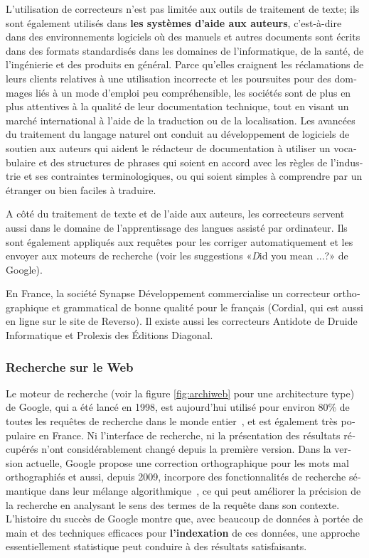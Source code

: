 \begin{french}
\begin{multicols}{2}
L'utilisation de correcteurs n'est pas limitée aux outils de
traitement de texte; ils sont également utilisés dans {\bf les systèmes
d'aide aux auteurs}, c'est-à-dire dans des environnements logiciels où
des manuels et autres documents sont écrits dans des formats
standardisés dans les domaines de l'informatique, de la santé, de
l'ingénierie et des produits en général. Parce qu'elles craignent les
réclamations de leurs clients relatives à une utilisation incorrecte
et les poursuites pour des dommages liés à un mode d'emploi peu
compréhensible, les sociétés sont de plus en plus attentives à la
qualité de leur documentation technique, tout en visant un marché
international à l'aide de la traduction ou de la localisation. Les
avancées du traitement du langage naturel ont conduit au développement
de logiciels de soutien aux auteurs qui aident le rédacteur de
documentation à utiliser un vocabulaire et des structures de phrases
qui soient en accord avec les règles de l'industrie et ses
contraintes terminologiques, ou qui soient simples à comprendre par un
étranger ou bien faciles à traduire.

A côté du traitement de texte et de l'aide aux auteurs, les
correcteurs servent aussi dans le domaine de l'apprentissage des
langues assisté par ordinateur. Ils sont également appliqués aux
requêtes pour les corriger automatiquement et les envoyer aux moteurs
de recherche (voir les suggestions «{\textit Did you mean ...?}» de
Google).

En France, la société Synapse Développement commercialise un
correcteur orthographique et grammatical de bonne qualité pour le
français (Cordial, qui est aussi en ligne sur le site de Reverso). Il
existe aussi les correcteurs Antidote de Druide Informatique et
Prolexis des Éditions Diagonal.

\subsubsection{Recherche sur le Web}
Le moteur de recherche (voir la figure \ref{fig:archiweb} pour une
architecture type) de Google, qui a été lancé en 1998, est aujourd'hui 
utilisé pour environ 80\% de toutes les requêtes de recherche
dans le monde entier~\cite{googleworld}, et est également très
populaire en France. Ni l'interface de recherche, ni la présentation
des résultats récupérés n'ont considérablement changé depuis la
première version. Dans la version actuelle, Google propose une
correction orthographique pour les mots mal orthographiés et aussi,
depuis 2009, incorpore des fonctionnalités de recherche sémantique
dans leur mélange algorithmique~\cite{googlesemantics}, ce qui peut
améliorer la précision de la recherche en analysant le sens des termes
de la requête dans son contexte. L'histoire du succès de Google montre
que, avec beaucoup de données à portée de main et des techniques
efficaces pour {\bf l'indexation} de ces données, une approche
essentiellement statistique peut conduire à des résultats
satisfaisants.


\end{multicols}
\end{french}
